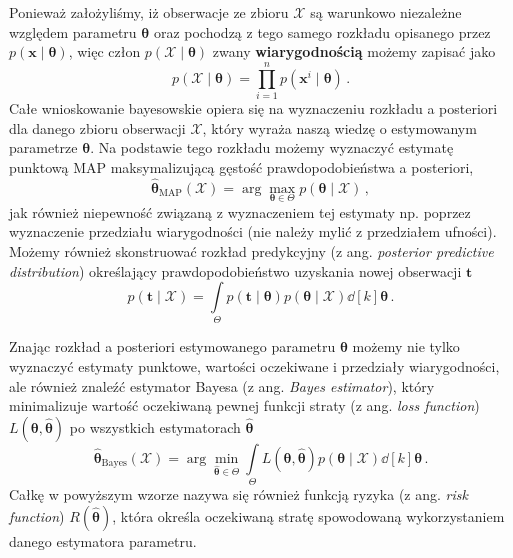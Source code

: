 \documentclass{myclass}
\numberwithin{equation}{section}
\begin{document}
Ponieważ założyliśmy, iż obserwacje ze zbioru \(\mathcal{X}\) są warunkowo niezależne względem
parametru \(\boldsymbol{\theta}\) oraz pochodzą z tego samego rozkładu opisanego przez
\(p(\mathbf{x} \mid \boldsymbol{\theta})\), więc człon \(p(\mathcal{X} \mid \boldsymbol{\theta})\)
zwany \textbf{wiarygodnością} możemy zapisać jako
\begin{equation}
    p(\mathcal{X} \mid \boldsymbol{\theta}) = \prod_{i=1}^n p(\mathbf{x}^i \mid \boldsymbol{\theta})\,.    
\end{equation}
Całe wnioskowanie bayesowskie opiera się na wyznaczeniu rozkładu a posteriori dla danego zbioru
obserwacji \(\mathcal{X}\), który wyraża naszą wiedzę o estymowanym parametrze
\(\boldsymbol{\theta}\). Na podstawie tego rozkładu możemy wyznaczyć estymatę punktową MAP
maksymalizującą gęstość prawdopodobieństwa a posteriori, 
\begin{equation}
    \boldsymbol{\hat \theta}_\mathrm{MAP}(\mathcal{X}) = \arg \max_{\boldsymbol{\theta} \in \Theta} p(\boldsymbol{\theta} \mid \mathcal{X})\,,
\end{equation}
jak również niepewność związaną z wyznaczeniem tej estymaty np. poprzez wyznaczenie przedziału
wiarygodności (nie należy mylić z przedziałem ufności). Możemy również skonstruować rozkład
predykcyjny (z ang. \textit{posterior predictive distribution}) określający prawdopodobieństwo
uzyskania nowej obserwacji \(\mathbf{t}\)\
\begin{equation}
    p(\mathbf{t} \mid \mathcal{X}) = \int\limits_\Theta p(\mathbf{t} \mid \boldsymbol{\theta}) p(\boldsymbol{\theta} \mid \mathcal{X}) \dd[k]{\boldsymbol{\theta}}\,.
\end{equation}

Znając rozkład a posteriori estymowanego parametru \(\boldsymbol{\theta}\) możemy nie tylko
wyznaczyć estymaty punktowe, wartości oczekiwane i przedziały wiarygodności, ale również znaleźć
estymator Bayesa (z ang. \textit{Bayes estimator}), który minimalizuje wartość oczekiwaną pewnej
funkcji straty (z ang. \textit{loss function}) \(L(\boldsymbol{\theta}, \boldsymbol{\hat \theta})\)
po wszystkich estymatorach \(\boldsymbol{\hat \theta}\)
\begin{equation}
    \boldsymbol{\hat \theta}_\mathrm{Bayes}(\mathcal{X}) = \arg\min_{\boldsymbol{\hat \theta} \in \Theta} \int\limits_{\Theta} L(\boldsymbol{\theta}, \boldsymbol{\hat \theta}) p(\boldsymbol{\theta} \mid \mathcal{X}) \dd[k]{\boldsymbol{\theta}}\,.
\end{equation}
Całkę w powyższym wzorze nazywa się również funkcją ryzyka (z ang. \textit{risk function})
\(R(\boldsymbol{\hat \theta})\), która określa oczekiwaną stratę spowodowaną wykorzystaniem danego
estymatora parametru.
\end{document}
